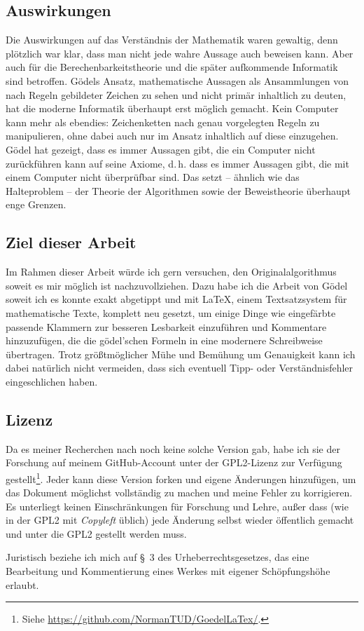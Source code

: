 \subsection*{Auswirkungen}

Die Auswirkungen auf das Verständnis der Mathematik waren gewaltig, denn plötzlich war klar,
dass man nicht jede wahre Aussage auch beweisen kann. Aber auch für die Berechenbarkeitstheorie
und die später aufkommende Informatik sind betroffen. Gödels Ansatz, mathematische
Aussagen als Ansammlungen von nach Regeln gebildeter Zeichen zu sehen und nicht primär
inhaltlich zu deuten, hat die moderne Informatik überhaupt erst möglich gemacht.
Kein Computer kann mehr als ebendies: Zeichenketten nach genau vorgelegten Regeln
zu manipulieren, ohne dabei auch nur im Ansatz inhaltlich auf diese einzugehen. Gödel hat
gezeigt, dass es immer Aussagen gibt, die ein Computer nicht zurückführen kann auf
seine Axiome, d.\,h. dass es immer Aussagen gibt, die mit einem Computer nicht überprüfbar sind.
Das setzt -- ähnlich wie das Halteproblem -- der Theorie der Algorithmen sowie
der Beweistheorie überhaupt enge Grenzen.

\subsection*{Ziel dieser Arbeit}

Im Rahmen dieser Arbeit würde ich gern versuchen, den Originalalgorithmus soweit
es mir möglich ist nachzuvollziehen. Dazu habe ich die Arbeit von Gödel soweit ich 
es konnte exakt abgetippt und mit \LaTeX, einem Textsatzsystem für mathematische
Texte, komplett neu gesetzt, um einige Dinge wie eingefärbte passende Klammern zur besseren 
Lesbarkeit einzuführen und Kommentare hinzuzufügen, die die gödel'schen Formeln in eine modernere
Schreibweise übertragen. Trotz größtmöglicher Mühe und Bemühung um Genauigkeit
kann ich dabei natürlich nicht vermeiden, dass sich eventuell Tipp- oder Verständnisfehler 
eingeschlichen haben.

\subsection*{Lizenz}

Da es meiner Recherchen nach noch keine solche Version gab, habe ich sie der
Forschung auf meinem GitHub-Account unter der GPL2-Lizenz zur Verfügung 
gestellt\footnote{Siehe \url{https://github.com/NormanTUD/GoedelLaTex/}.}.
Jeder kann diese Version forken und eigene Änderungen hinzufügen, um das
Dokument möglichst vollständig zu machen und meine Fehler zu korrigieren.
Es unterliegt keinen Einschränkungen für Forschung und Lehre, außer dass 
(wie in der GPL2 mit \textit{Copyleft} üblich) jede Änderung selbst wieder
öffentlich gemacht und unter die GPL2 gestellt werden muss.

Juristisch beziehe ich mich auf §~3 des Urheberrechtsgesetzes, das eine
Bearbeitung und Kommentierung eines Werkes mit eigener Schöpfungshöhe
erlaubt.

\newpage
{}
\setcounter{footnote}{0}
\setcounter{page}{173}
\let\thefootnote\originalthefootnote
